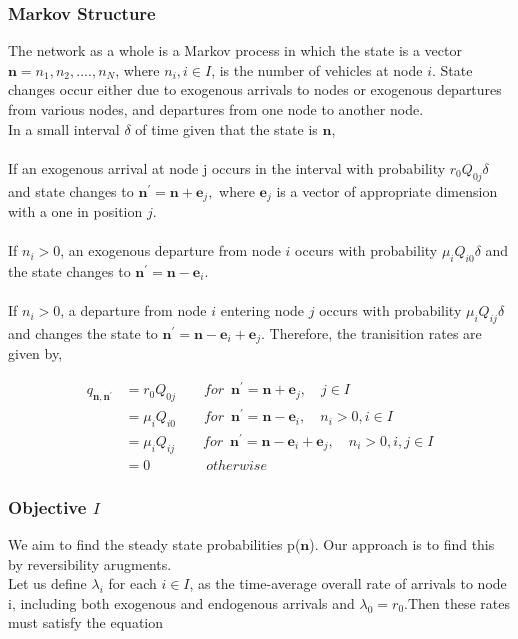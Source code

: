 \documentclass[a4paper,12pt]{scrartcl}
\begin{document}
\subsubsection*{Markov Structure}
The network as a whole is a Markov process in which the state is a vector $\textbf{n} = {n_1,n_2,....,n_N}$, where $n_i, i \in I$, is the number of vehicles at node $i$. State changes occur either due to exogenous arrivals to nodes or exogenous departures from various nodes, and departures from one node to another node.\\
In a small interval $\delta$ of time given that the state is $\textbf{n}$,\\
\\
If an exogenous arrival at node j occurs in the interval with probability $r_0Q_{0j}\delta$ and state changes to $\textbf{n}^{\prime} = \textbf{n} + \textbf{e}_j,$ where $\textbf{e}_j$ is a vector of appropriate dimension with a one in position $j$.\\
\\
If $n_i > 0 $, an exogenous departure from node $i$ occurs with probability $\mu_iQ_{i0}\delta$ and the state changes to $\textbf{n}^{\prime} = \textbf{n} - \textbf{e}_i.$\\
\\ 
If $n_i > 0 $, a departure from node $i$ entering node $j$ occurs with probability $\mu_iQ_{ij}\delta$ and changes the state to $\textbf{n}^{\prime} = \textbf{n} - \textbf{e}_i + \textbf{e}_j.$ Therefore, the tranisition rates are given by,

\begin{align}
q_{\textbf{n},\textbf{n}^{\prime}}&=r_0Q_{0j}\quad\quad for\enspace\textbf{n}^{\prime} = \textbf{n} + \textbf{e}_j,\quad j\in I\\
&=\mu_iQ_{i0} \quad\quad for\enspace\textbf{n}^{\prime} = \textbf{n} - \textbf{e}_i,\quad n_i > 0, i \in I\\
&=\mu_iQ_{ij} \quad\quad for\enspace\textbf{n}^{\prime} = \textbf{n} - \textbf{e}_i + \textbf{e}_j,\quad n_i > 0, i,j \in I\\
&= 0 \quad\quad\quad\quad otherwise
\end{align}

\subsubsection*{Objective $\mathit{I}$}
We aim to find the steady state probabilities p($\textbf{n}$).  Our approach is to find this by reversibility arugments.\\
Let us define $\lambda_i$ for each $i \in I$, as the time-average overall rate of arrivals to node i, including both exogenous and endogenous arrivals and $\lambda_0 = r_0$.Then these rates must satisfy the equation
\end{document}
